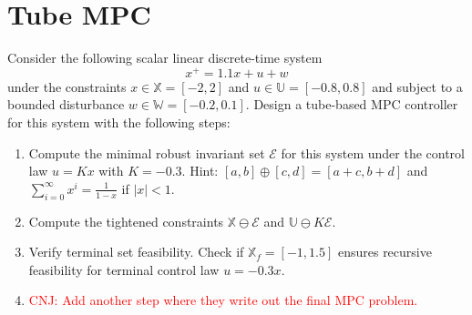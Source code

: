\setcounter{section}{0}
\section{Tube MPC}

Consider the following scalar linear discrete-time system 
    \begin{equation*}
        x^+ = 1.1 x + u + w 
    \end{equation*}
under the constraints $x \in \mathbb{X} = [-2, 2]$ and $u \in \mathbb{U} = [-0.8, 0.8]$ and subject to a bounded disturbance $w \in \mathbb{W} = [-0.2,0.1]$. Design a tube-based MPC controller for this system with the following steps: 
\begin{enumerate}
    \item Compute the minimal robust invariant set $\mathcal{E}$ for this system under the control law $u = Kx$ with $K = -0.3$. 
    Hint: $[a,b] \oplus [c,d] = [a+c,b+d]$ and $\sum_{i=0}^{\infty}x^{i} = \frac{1}{1-x}$ if $|x| < 1$. 
    \vspace{5\baselineskip}
    \item Compute the tightened constraints $\mathbb{X} \ominus \mathcal{E}$ and $\mathbb{U} \ominus K\mathcal{E}$. \vspace{5\baselineskip}
    \item Verify terminal set feasibility. Check if $\mathbb{X}_f = [-1, 1.5]$ ensures recursive feasibility for terminal control law $u = -0.3x$. \vspace{5\baselineskip}
    \item \textcolor{red}{CNJ: Add another step where they write out the final MPC problem.}
\end{enumerate}


